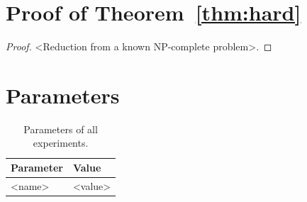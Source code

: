 \section{Proof of Theorem~\ref{thm:hard}}
\label{app:proof-hard}
\begin{proof}
<Reduction from a known NP-complete problem>.
\end{proof}

\section{Parameters}
\label{app:params}
\begin{table}[h]
\centering
\caption{Parameters of all experiments.}
\label{tab:params}
\footnotesize
\begin{tabular}{@{}ll@{}}
\toprule
Parameter & Value \\
\midrule
<name> & <value> \\
\bottomrule
\end{tabular}
\end{table}
